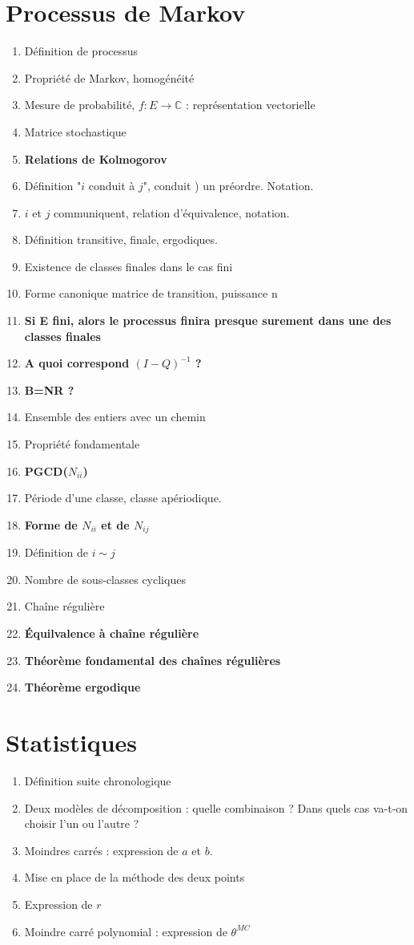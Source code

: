 \documentclass{article}
\begin{document}
\part{Processus de Markov}
\begin{enumerate}
\item Définition de processus
\item Propriété de Markov, homogénéité
\item Mesure de probabilité, $f:E\to\mathbb{C}$ : représentation vectorielle
\item Matrice stochastique
\item \textbf{Relations de Kolmogorov}
\item Définition "$i$ conduit à $j$", conduit ) un préordre. Notation.
\item $i$ et $j$ communiquent, relation d'équivalence, notation.
\item Définition transitive, finale, ergodiques.
\item Existence de classes finales dans le cas fini
\item Forme canonique matrice de transition, puissance n
\item \textbf{Si E fini, alors le processus finira presque surement dans une des classes finales}
\item \textbf{A quoi correspond $(I-Q)^{-1}$ ?}
\item \textbf{B=NR ?}
\item Ensemble des entiers avec un chemin
\item Propriété fondamentale
\item \textbf{PGCD($N_{ii}$)}
\item Période d'une classe, classe apériodique.
\item \textbf{Forme de $N_{ii}$ et de $N_{ij}$}
\item Définition de $i\sim j$
\item Nombre de sous-classes cycliques
\item Chaîne régulière
\item \textbf{Équilvalence à chaîne régulière}
\item \textbf{Théorème fondamental des chaînes régulières}
\item \textbf{Théorème ergodique}
\end{enumerate}

\part{Statistiques}
\begin{enumerate}
\item Définition suite chronologique
\item Deux modèles de décomposition : quelle combinaison ? Dans quels cas va-t-on choisir l'un ou l'autre ?
\item Moindres carrés : expression de $a$ et $b$. 
\item Mise en place de la méthode des deux points
\item Expression de $r$
\item Moindre carré polynomial : expression de $\theta^{MC}$
\end{enumerate}
\end{document}
